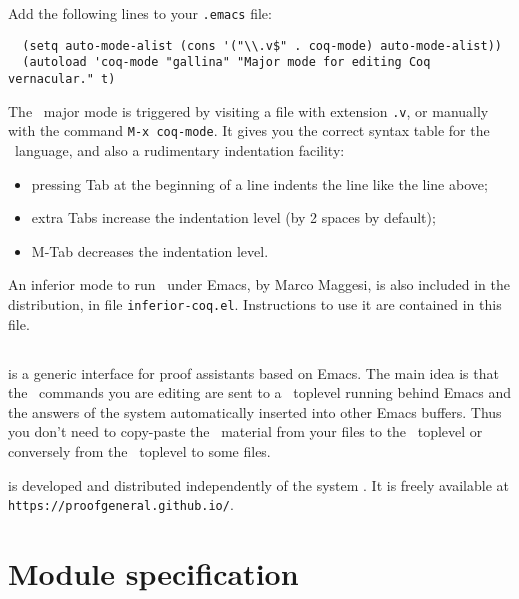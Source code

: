 Add the following lines to your \verb!.emacs! file:

\begin{verbatim}
  (setq auto-mode-alist (cons '("\\.v$" . coq-mode) auto-mode-alist))
  (autoload 'coq-mode "gallina" "Major mode for editing Coq vernacular." t)
\end{verbatim}

The \Coq\ major mode is triggered by visiting a file with extension {\tt .v},
or manually with the command \verb!M-x coq-mode!.
It gives you the correct syntax table for
the \Coq\ language, and also a rudimentary indentation facility:
\begin{itemize}
  \item pressing {\sc Tab} at the beginning of a line indents the line like
    the line above;

  \item extra {\sc Tab}s increase the indentation level
    (by 2 spaces by default);

  \item M-{\sc Tab} decreases the indentation level.
\end{itemize}

An inferior mode to run \Coq\ under Emacs, by Marco Maggesi, is also
included in the distribution, in file \texttt{inferior-coq.el}.
Instructions to use it are contained in this file.

\subsection[{\ProofGeneral}]{{\ProofGeneral}}

{\ProofGeneral} is a generic interface for proof assistants based on
Emacs. The main idea is that the \Coq\ commands you are
editing are sent to a \Coq\ toplevel running behind Emacs and the
answers of the system automatically inserted into other Emacs buffers.
Thus you don't need to copy-paste the \Coq\ material from your files
to the \Coq\ toplevel or conversely from the \Coq\ toplevel to some
files.

{\ProofGeneral} is developed and distributed independently of the
system \Coq. It is freely available at \verb!https://proofgeneral.github.io/!.


\section[Module specification]{Module specification\label{gallina}}


